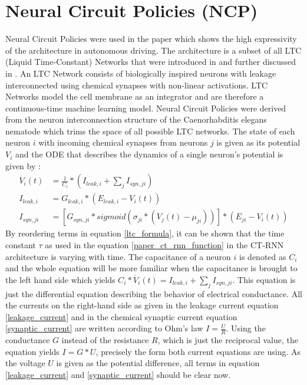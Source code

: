 \documentclass[draft,final]{vutinfth} %
\begin{document}
\section{Neural Circuit Policies (NCP)} \label{ncp}
Neural Circuit Policies were used in the paper \cite{NCP} which shows the high expressivity of the architecture in autonomous driving.
The architecture is a subset of all LTC (Liquid Time-Constant) Networks that were introduced in \cite{LTCFormulas} and further discussed in \cite{LTCNetworks}.
An LTC Network consists of biologically inspired neurons with leakage interconnected using chemical synapses with non-linear activations.
LTC Networks model the cell membrane as an integrator and are therefore a continuous-time machine learning model.
Neural Circuit Policies were derived from the neuron interconnection structure of the Caenorhabditis elegans nematode \cite[p. 3]{NCP} which trims the space of all possible LTC networks.
The state of each neuron $i$ with incoming chemical synapses from neurons $j$ is given as its potential $V_i$ and the ODE that describes the dynamics of a single neuron's potential is given by \cite[p. 1-2]{LTCFormulas}:
\begin{align}
\label{ltc_formula}
\dot{V_i}(t) &= \frac{1}{C_i} * (I_{leak,i} + \sum_j{I_{syn,ji}}) \\
\label{leakage_current}
I_{leak,i} &= G_{leak,i} * (E_{leak,i} - V_i(t)) \\
\label{synaptic_current}
I_{syn,ji} &= [G_{syn,ji} * sigmoid(\sigma_{ji}*(V_j(t)-\mu_{ji}))] * (E_{ji} - V_i(t))
\end{align}
By reordering terms in equation \ref{ltc_formula}, it can be shown that the time constant $\tau$ as used in the equation \ref{paper_ct_rnn_function} in the CT-RNN architecture is varying with time.
The capacitance of a neuron $i$ is denoted as $C_i$ and the whole equation will be more familiar when the capacitance is brought to the left hand side which yields $C_i * \dot{V_i}(t) = I_{leak,i} + \sum_j{I_{syn,ji}}$.
This equation is just the differential equation describing the behavior of electrical conductance.
All the currents on the right-hand side as given in the leakage current equation \ref{leakage_current} and in the chemical synaptic current equation \ref{synaptic_current} are written according to Ohm's law $I = \frac{U}{R}$.
Using the conductance $G$ instead of the resistance $R$, which is just the reciprocal value, the equation yields $I = G * U$, precisely the form both current equations are using.
As the voltage $U$ is given as the potential difference, all terms in equation \ref{leakage_current} and \ref{synaptic_current} should be clear now.
\end{document}
